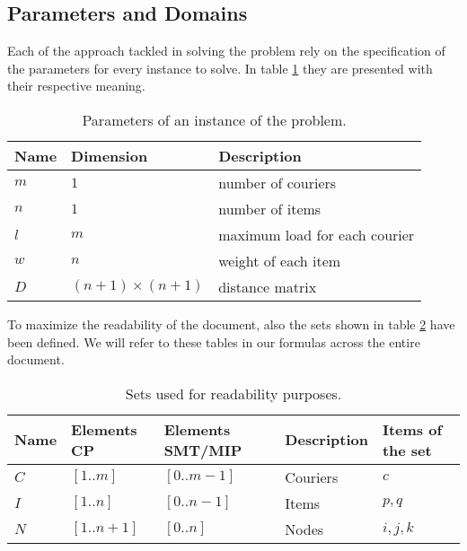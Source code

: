 \subsection{Parameters and Domains}
Each of the approach tackled in solving the problem rely on the specification of the parameters for every instance to solve. In table \ref{tab:params} they are presented with their respective meaning.
\begin{table}[H]
    \centering
    \begin{tabular}{@{}lll@{}}
        \toprule
Name & Dimension     & Description                   \\ \midrule
$m$    & $1$             & number of couriers            \\
$n$    & $1$            & number of items               \\
$l$    & $m$             & maximum load for each courier \\
$w$    & $n$             & weight of each item          \\
$D$    & $(n+1) \times (n+1)$ & distance matrix               \\ \bottomrule
    \end{tabular}
    \caption{Parameters of an instance of the problem.}
    \label{tab:params}
\end{table}
To maximize the readability of the document, also the sets shown in table \ref{tab:sets} have been defined. We will refer to these tables in our formulas across the entire document.
\begin{table}[H]
    \centering
    \begin{tabular}{@{}lllll@{}}
        \toprule
Name & Elements CP & Elements SMT/MIP & Description & Items of the set                \\ \midrule
$C$    & $[1..m]$   & $[0..m-1]$          & Couriers  & $c$          \\
$I$    & $[1..n]$  & $[0..n-1]$          & Items & $p, q$                \\
$N$    & $[1..n+1]$   & $[0..n]$          & Nodes & $i, j, k$  \\ \bottomrule
    \end{tabular}
    \caption{Sets used for readability purposes.}
    \label{tab:sets}
\end{table}

